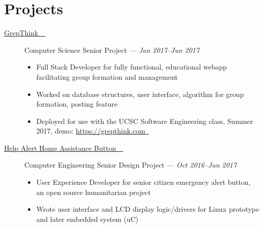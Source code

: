 \documentclass[10pt]{article}
\let\orighref\href%
\renewcommand{\href}[2]{\orighref{#1}{#2{\scriptsize~\color{darkgray}\faExternalLink}}}
\renewcommand{\url}[1]{\href{#1}{#1}}
\begin{document}
\section*{Projects}
\begin{description}
  \item[\href{https://github.com/grepthink/grepthink}{GrepThink}] Computer
    Science Senior Project --- \textit{Jan 2017--Jun 2017}
    \begin{itemize}
      \item Full Stack Developer for fully functional, educational webapp
        facilitating group formation and management
      \item Worked on database structures, user interface, algorithm for group
        formation, posting feature
      \item Deployed for use with the UCSC Software Engineering class, Summer
        2017, demo: \url{https://grepthink.com}
    \end{itemize}
  \item[\href{https://github.com/HaHaSDP-UCSC}{Help Alert Home Assistance
    Button}] Computer Engineering Senior Design Project --- \textit{Oct 2016--Jun 2017}
    \begin{itemize}
      \item User Experience Developer for senior citizen emergency alert button,
        an open source humanitarian project
      \item Wrote user interface and LCD display logic/drivers for Linux
        prototype and later embedded system (uC)
    \end{itemize}
\end{description}
\end{document}
